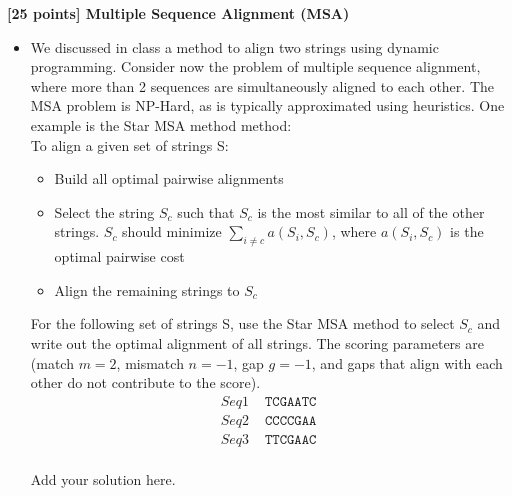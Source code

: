 {\bf [25 points] Multiple Sequence Alignment (MSA)}\\
\begin{itemize}


\item  We discussed in class a method to align two strings using dynamic programming. Consider now the problem of multiple sequence alignment, where more than 2 sequences are simultaneously aligned to each other. The MSA problem is NP-Hard, as is typically approximated using heuristics. One example is the Star MSA method method:\\
To align a given set of strings S:
\begin{itemize}
    \item Build all optimal pairwise alignments
    \item Select the string $S_c$ such that $S_c$ is the most similar to all of the other strings. $S_c$ should minimize $\sum_{i \neq c} a(S_i, S_c)$, where $a(S_i, S_c)$ is the optimal pairwise cost
    \item Align the remaining strings to $S_c$
\end{itemize}
For the following set of strings S, use the Star MSA method to select $S_c$ and write out the optimal alignment of all strings. The scoring parameters are (match $m=2$, mismatch $n=-1$, gap $g=-1$, and gaps that align with each other do not contribute to the score).
\begin{align*}
Seq1& \texttt{  TCGAATC}\\
Seq2& \texttt{  CCCCGAA	}\\
Seq3& \texttt{  TTCGAAC}\\
\end{align*}

\begin{solution}
Add your solution here.
\end{solution}


\end{itemize}
